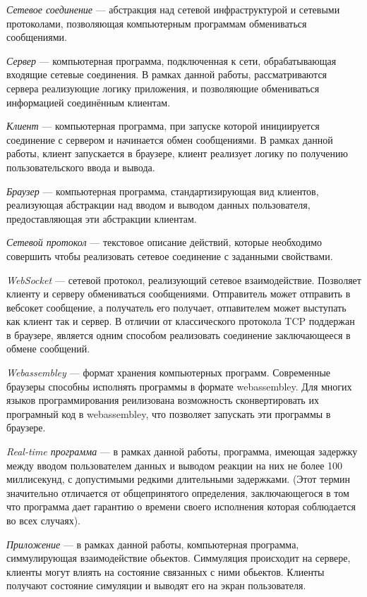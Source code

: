 \documentclass[a4paper,14pt, openany]{book}
\begin{document}
\emph{Сетевое соединение} --- абстракция над сетевой инфраструктурой и сетевыми протоколами, позволяющая компьютерным программам обмениваться сообщениями.

\emph{Сервер} --- компьютерная программа, подключенная к сети,  обрабатывающая входящие сетевые соединения. В рамках данной работы, рассматриваются сервера реализующие логику приложения, и позволяющие обмениваться информацией соединённым клиентам. 

\emph{Клиент} --- компьютерная программа, при запуске которой инициируется соединение с сервером и начинается обмен сообщениями. В рамках данной работы, клиент запускается в браузере, клиент реализует логику по получению пользовательского ввода и вывода.

\emph{Браузер} --- компьютерная программа, стандартизирующая вид клиентов, реализующая абстракции над вводом и выводом данных пользователя, предоставляющая эти абстракции клиентам.

\emph{Сетевой протокол} --- текстовое описание действий, которые необходимо совершить чтобы реализовать сетевое соединение с заданными свойствами.

\emph{WebSocket \cite{websocket}} --- сетевой протокол, реализующий сетевое взаимодействие. Позволяет клиенту и серверу обмениваться сообщениями. Отправитель может отправить в вебсокет сообщение, а получатель его получает, отпавителем может выступать как клиент так и сервер. В отличии от классического протокола TCP поддержан в браузере, является одним способом реализовать соединение заключающееся в обмене сообщений.

\emph{Webassembley \cite{webassembley}} --- формат хранения компьютерных программ. Современные браузеры способны исполнять программы в формате webassembley. Для многих языков программирования реилизована возможность сконвертировать их програмный код в webassembley, что позволяет запускать эти программы в браузере.

\emph{Real-time программа} --- в рамках данной работы, программа, имеющая задержку между вводом пользователем данных и выводом реакции на них не более 100 миллисекунд, с допустимыми редкими длительными задержками. (Этот термин значительно отличается от общепринятого определения, заключающегося в том что программа дает гарантию о времени своего исполнения которая соблюдается во всех случаях). 

\emph{Приложение} --- в рамках данной работы, компьютерная программа, симмулирующая взаимодействие обьектов. Симмуляция происходит на сервере, клиенты могут влиять на состояние связанных с ними обьектов. Клиенты получают состояние симуляции и выводят его на экран пользователя.
\end{document}
